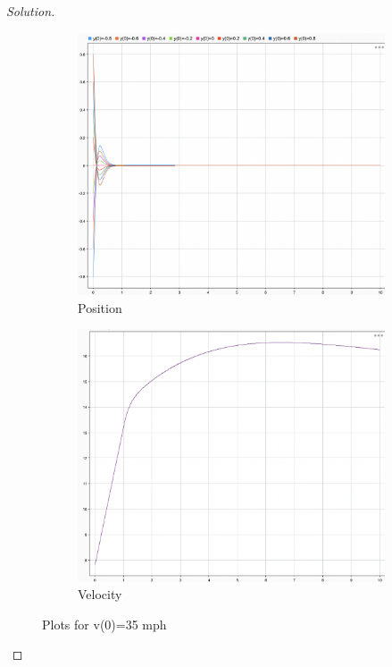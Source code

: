 \documentclass{article}
\begin{document}
\begin{proof}[Solution]
  \begin{figure}[h!]
    \centering
    \begin{subfigure}{0.4\linewidth}
      \includegraphics[width=\linewidth]{img16.png}
      \caption{Position}
    \end{subfigure}
    \begin{subfigure}{0.4\linewidth}
      \includegraphics[width=\linewidth]{img17.png}
      \caption{Velocity}
    \end{subfigure}
    \caption{Plots for v(0)=35 mph}
  \end{figure}


\end{proof}
\end{document}

